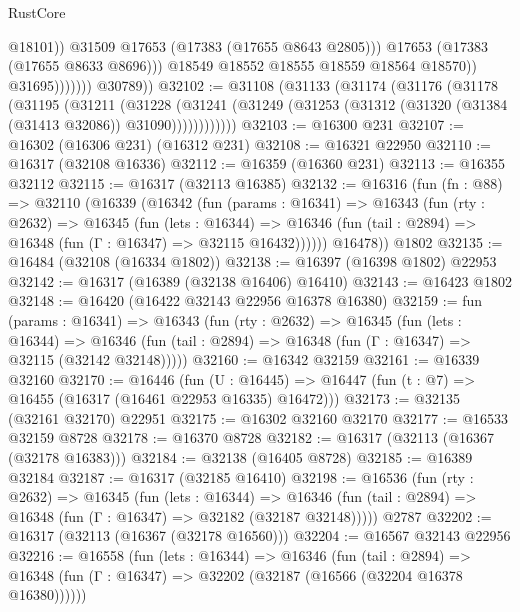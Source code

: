 \begin{lexlean}{RustCore}
\begin{coremodule}
                                  @18101))
                              @31509
                              @17653
                              (@17383 (@17655 @8643 @2805)))
                            @17653
                            (@17383 (@17655 @8633 @8696)))
                          @18549
                          @18552
                          @18555
                          @18559
                          @18564
                          @18570))
                      @31695)))))))
        @30789))
@32102 := @31108
    (@31133
      (@31174
        (@31176
          (@31178
            (@31195
              (@31211
                (@31228
                  (@31241
                    (@31249 (@31253 (@31312 (@31320 (@31384 (@31413 @32086)) @31090))))))))))))
@32103 := @16300 @231
@32107 := @16302 (@16306 @231) (@16312 @231)
@32108 := @16321 @22950
@32110 := @16317 (@32108 @16336)
@32112 := @16359 (@16360 @231)
@32113 := @16355 @32112
@32115 := @16317 (@32113 @16385)
@32132 := @16316
    (fun (fn : @88) =>
    @32110
      (@16339
        (@16342
          (fun (params : @16341) =>
          @16343
            (fun (rty : @2632) =>
            @16345
              (fun (lets : @16344) =>
              @16346 (fun (tail : @2894) => @16348 (fun (Γ : @16347) => @32115 @16432))))))
        @16478))
    @1802
@32135 := @16484 (@32108 (@16334 @1802))
@32138 := @16397 (@16398 @1802) @22953
@32142 := @16317 (@16389 (@32138 @16406) @16410)
@32143 := @16423 @1802
@32148 := @16420 (@16422 @32143 @22956 @16378 @16380)
@32159 := fun (params : @16341) =>
  @16343
    (fun (rty : @2632) =>
    @16345
      (fun (lets : @16344) =>
      @16346 (fun (tail : @2894) => @16348 (fun (Γ : @16347) => @32115 (@32142 @32148)))))
@32160 := @16342 @32159
@32161 := @16339 @32160
@32170 := @16446
    (fun (U : @16445) => @16447 (fun (t : @7) => @16455 (@16317 (@16461 @22953 @16335) @16472)))
@32173 := @32135 (@32161 @32170) @22951
@32175 := @16302 @32160 @32170
@32177 := @16533 @32159 @8728
@32178 := @16370 @8728
@32182 := @16317 (@32113 (@16367 (@32178 @16383)))
@32184 := @32138 (@16405 @8728)
@32185 := @16389 @32184
@32187 := @16317 (@32185 @16410)
@32198 := @16536
    (fun (rty : @2632) =>
    @16345
      (fun (lets : @16344) =>
      @16346 (fun (tail : @2894) => @16348 (fun (Γ : @16347) => @32182 (@32187 @32148)))))
    @2787
@32202 := @16317 (@32113 (@16367 (@32178 @16560)))
@32204 := @16567 @32143 @22956
@32216 := @16558
    (fun (lets : @16344) =>
    @16346
      (fun (tail : @2894) =>
      @16348 (fun (Γ : @16347) => @32202 (@32187 (@16566 (@32204 @16378 @16380))))))

\end{coremodule}
\end{lexlean}
